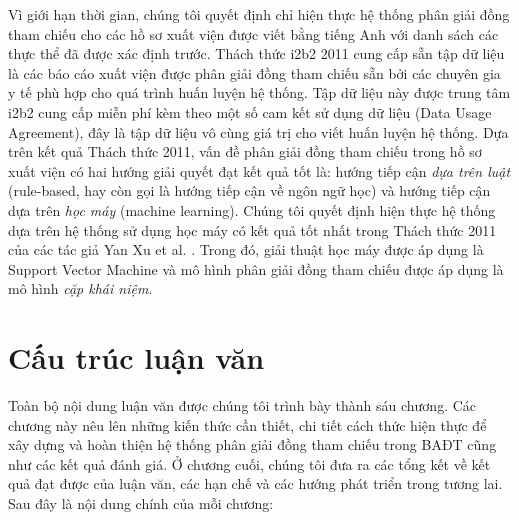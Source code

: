 Vì giới hạn thời gian, chúng tôi quyết định chỉ hiện thực hệ thống phân giải đồng tham chiếu cho các hồ sơ xuất viện được viết bằng tiếng Anh với danh sách các thực thể đã được xác định trước. Thách thức i2b2 2011 cung cấp sẵn tập dữ liệu là các báo cáo xuất viện được phân giải đồng tham chiếu sẵn bởi các chuyên gia y tế phù hợp cho quá trình huấn luyện hệ thống. Tập dữ liệu này được trung tâm i2b2 cung cấp miễn phí kèm theo một số cam kết sử dụng dữ liệu (Data Usage Agreement), đây là tập dữ liệu vô cùng giá trị cho viết huấn luyện hệ thống. Dựa trên kết quả Thách thức 2011, vấn đề phân giải đồng tham chiếu trong hồ sơ xuất viện có hai hướng giải quyết đạt kết quả tốt là: hướng tiếp cận \emph{dựa trên luật} (rule-based, hay còn gọi là hướng tiếp cận về ngôn ngữ học) và hướng tiếp cận dựa trên \emph{học máy} (machine learning). Chúng tôi quyết định hiện thực hệ thống dựa trên hệ thống sử dụng học máy có kết quả tốt nhất trong Thách thức 2011 của các tác giả Yan Xu et al. \cite{YanXu2012}. Trong đó, giải thuật học máy được áp dụng là Support Vector Machine và mô hình phân giải đồng tham chiếu được áp dụng là mô hình \emph{cặp khái niệm}.

\section{Cấu trúc luận văn}
Toàn bộ nội dung luận văn được chúng tôi trình bày thành sáu chương. Các chương này nêu lên những kiến thức cần thiết, chi tiết cách thức hiện thực để xây dựng và hoàn thiện hệ thống phân giải đồng tham chiếu trong BAĐT cũng như các kết quả đánh giá. Ở chương cuối, chúng tôi đưa ra các tổng kết về kết quả đạt được của luận văn, các hạn chế và các hướng phát triển trong tương lai. Sau đây là nội dung chính của mỗi chương:

